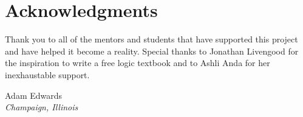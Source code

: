 
\chapter{Acknowledgments}
\begin{fullwidth}
Thank you to all of the mentors and students that have supported this project and have helped it become a reality. Special thanks to Jonathan Livengood for the inspiration to write a free logic textbook and to Ashli Anda for her inexhaustable support.

\begin{adjustwidth}{2em}{0em}
Adam Edwards \\
\noindent \emph{Champaign, Illinois}
\end{adjustwidth}
\end{fullwidth}
\pagebreak


